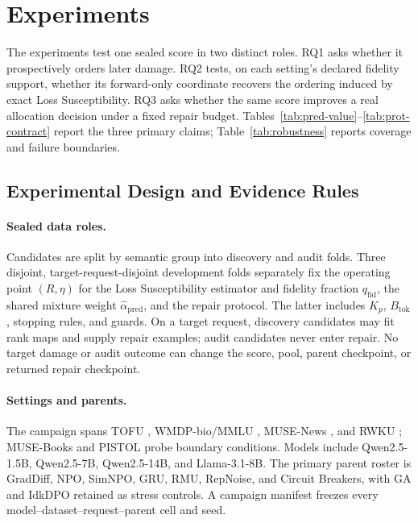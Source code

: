 \section{Experiments}
\label{sec:experiments}

The experiments test one sealed score in two distinct roles. RQ1 asks whether
it prospectively orders later damage. RQ2 tests, on each setting's declared
fidelity support, whether its forward-only coordinate recovers the ordering
induced by exact Loss Susceptibility. RQ3 asks whether
the same score improves a real allocation decision under a fixed repair
budget. Tables~\ref{tab:pred-value}--\ref{tab:prot-contract} report the three
primary claims; Table~\ref{tab:robustness} reports coverage and failure
boundaries.

\subsection{Experimental Design and Evidence Rules}
\label{sec:benchmark-protocol}

\paragraph{Sealed data roles.}
Candidates are split by semantic group into discovery and audit folds.
Three disjoint, target-request-disjoint development folds separately fix the
operating point $(R,\eta)$ for the Loss Susceptibility estimator
and fidelity fraction $q_{\mathrm{fid}}$, the shared mixture weight
$\widehat\alpha_{\mathrm{pred}}$, and the repair protocol. The latter includes
$K_p$, $B_{\mathrm{tok}}$, stopping rules, and guards. On a target
request, discovery candidates may fit rank maps and supply repair examples;
audit candidates never enter repair. No target damage or audit outcome can
change the score, pool, parent checkpoint, or returned repair checkpoint.

\paragraph{Settings and parents.}
The campaign spans TOFU \cite{maini2024tofu}, WMDP-bio/MMLU
\cite{li2024wmdp,hendrycks2021measuring}, MUSE-News \cite{shi2024muse}, and
RWKU \cite{jin2024rwku}; MUSE-Books and PISTOL \cite{qiu2024pistol} probe
boundary conditions. Models include Qwen2.5-1.5B, Qwen2.5-7B, Qwen2.5-14B,
and Llama-3.1-8B. The primary parent roster is GradDiff, NPO, SimNPO, GRU,
RMU, RepNoise, and Circuit Breakers, with GA and IdkDPO retained as stress
controls. A campaign manifest freezes every
model--dataset--request--parent cell and seed.


